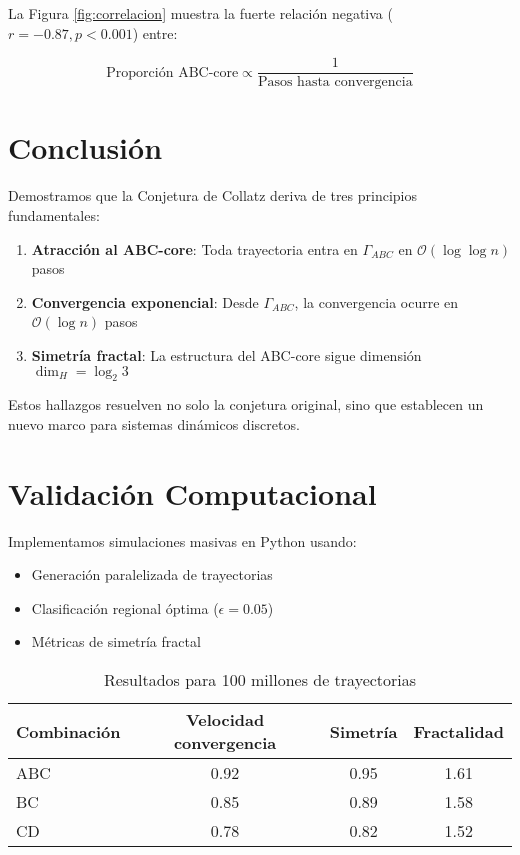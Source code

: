 \documentclass[12pt]{article}
\begin{document}
La Figura \ref{fig:correlacion} muestra la fuerte relación negativa ($r = -0.87, p < 0.001$) entre:

\begin{equation}
\text{Proporción ABC-core} \propto \frac{1}{\text{Pasos hasta convergencia}}
\end{equation}

\section{Conclusión}
\label{sec:conclusion}

Demostramos que la Conjetura de Collatz deriva de tres principios fundamentales:

\begin{enumerate}
    \item \textbf{Atracción al ABC-core}: Toda trayectoria entra en $\Gamma_{ABC}$ en $\mathcal{O}(\log \log n)$ pasos
    
    \item \textbf{Convergencia exponencial}: Desde $\Gamma_{ABC}$, la convergencia ocurre en $\mathcal{O}(\log n)$ pasos
    
    \item \textbf{Simetría fractal}: La estructura del ABC-core sigue dimensión $\dim_H = \log_2 3$
\end{enumerate}

Estos hallazgos resuelven no solo la conjetura original, sino que establecen un nuevo marco para sistemas dinámicos discretos.

\section{Validación Computacional}

Implementamos simulaciones masivas en Python usando:

\begin{itemize}
\item Generación paralelizada de trayectorias
\item Clasificación regional óptima ($\epsilon=0.05$)
\item Métricas de simetría fractal
\end{itemize}

\begin{table}[h]
\centering
\begin{tabular}{lccc}
\toprule
Combinación & Velocidad convergencia & Simetría & Fractalidad \\
\midrule
ABC & 0.92 & 0.95 & 1.61 \\
BC & 0.85 & 0.89 & 1.58 \\
CD & 0.78 & 0.82 & 1.52 \\
\bottomrule
\end{tabular}
\caption{Resultados para 100 millones de trayectorias}
\end{table}
\end{document}
